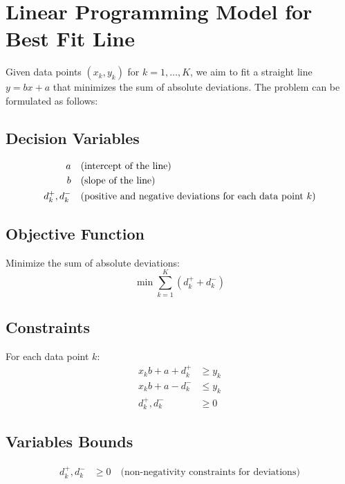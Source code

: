 \documentclass{article}
\begin{document}
\section*{Linear Programming Model for Best Fit Line}

Given data points \( (x_k, y_k) \) for \( k = 1, \ldots, K \), we aim to fit a straight line \( y = bx + a \) that minimizes the sum of absolute deviations. The problem can be formulated as follows:

\subsection*{Decision Variables}
\begin{align*}
a & \quad \text{(intercept of the line)} \\
b & \quad \text{(slope of the line)} \\
d_k^+, d_k^- & \quad \text{(positive and negative deviations for each data point \( k \))}
\end{align*}

\subsection*{Objective Function}
Minimize the sum of absolute deviations:
\[
\min \sum_{k=1}^{K} (d_k^+ + d_k^-)
\]

\subsection*{Constraints}
For each data point \( k \):
\begin{align*}
x_k b + a + d_k^+ & \geq y_k \\
x_k b + a - d_k^- & \leq y_k \\
d_k^+, d_k^- & \geq 0
\end{align*}

\subsection*{Variables Bounds}
\begin{align*}
d_k^+, d_k^- & \geq 0 \quad \text{(non-negativity constraints for deviations)}
\end{align*}
\end{document}
